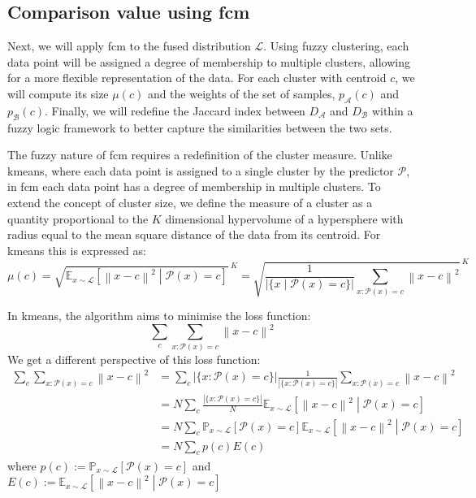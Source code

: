 \subsection{Comparison value using \gls{fcm}}
\begin{modified}
\noindent Next, we will apply \gls{fcm} to the fused distribution $\mathcal{L}$. Using fuzzy clustering, each data point will be assigned a degree of membership to multiple clusters, allowing for a more flexible representation of the data. For each cluster with centroid $c$, we will compute its size $\mu(c)$ and the weights of the set of samples, $p_\mathcal{A}(c)$ and $p_\mathcal{B}(c)$. Finally, we will redefine the Jaccard index between $D_\mathcal{A}$ and $D_\mathcal{B}$ within a fuzzy logic framework to better capture the similarities between the two sets.

\noindent The fuzzy nature of \gls{fcm} requires a redefinition of the cluster measure. Unlike \gls{kmeans}, where each data point is assigned to a single cluster by the predictor $\mathcal{P}$, in \gls{fcm} each data point has a degree of membership in multiple clusters. To extend the concept of cluster size, we define the measure of a cluster as a quantity proportional to the $K$ dimensional hypervolume of a hypersphere with radius equal to the mean square distance of the data from its centroid. For \gls{kmeans} this is expressed as:
\begin{equation*}
	\mu(c) = {\sqrt{\mathbb{E}_{x\sim\mathcal{L}}\left[\left\|x-c\right\|^2\middle|\mathcal{P}(x)=c\right]}\,}^{K} = {\sqrt{\frac{1}{\left|\{x\middle|\mathcal{P}(x)=c\}\right|}\sum_{x:\mathcal{P}(x)=c}\left\|x-c\right\|^2}\,}^{K}
\end{equation*}

\noindent In \gls{kmeans}, the algorithm aims to minimise the loss function:
\[
	\sum_c\sum_{x:\mathcal{P}(x)=c}\left\|x-c\right\|^2
\]
We get a different perspective of this loss function:
\begin{align*}
	\sum_c\sum_{x:\mathcal{P}(x)=c}\left\|x-c\right\|^2 &= \sum_c\left|\{x:\mathcal{P}(x)=c\}\right|\frac{1}{\left|\{x:\mathcal{P}(x)=c\}\right|}\sum_{x:\mathcal{P}(x)=c}\left\|x-c\right\|^2 \\
	&= N\sum_c\frac{\left|\{x:\mathcal{P}(x)=c\}\right|}{N}\mathbb{E}_{x\sim\mathcal{L}}\left[\left\|x-c\right\|^2\middle|\mathcal{P}(x)=c\right] \\
	&= N\sum_c\mathbb{P}_{x\sim\mathcal{L}}\left[\mathcal{P}(x)=c\right]\mathbb{E}_{x\sim\mathcal{L}}\left[\left\|x-c\right\|^2\middle|\mathcal{P}(x)=c\right] \\
	&= N\sum_c p(c)E(c)
\end{align*}
where $p(c):= \mathbb{P}_{x\sim\mathcal{L}}\left[\mathcal{P}(x)=c\right]$ and $E(c):= \mathbb{E}_{x\sim\mathcal{L}}\left[\left\|x-c\right\|^2\middle|\mathcal{P}(x)=c\right]$


\end{modified}
